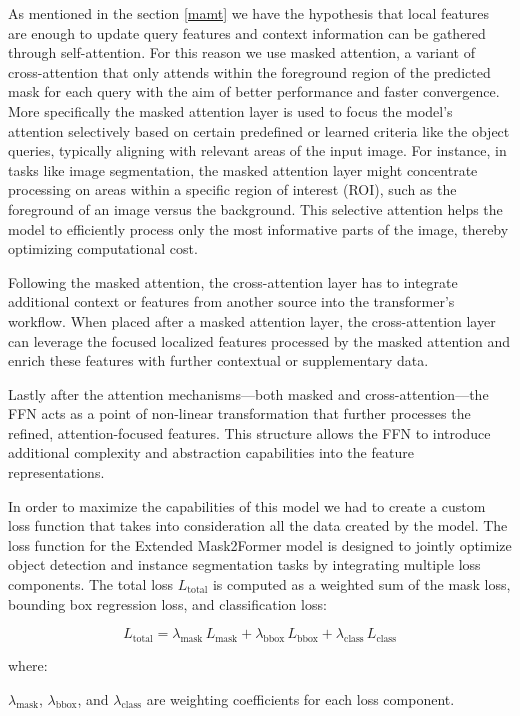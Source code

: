 \newpage
As mentioned in the section \ref{mamt} we have the hypothesis that local features are enough to update query features and context information can be 
gathered through self-attention. For this reason we use masked attention, a variant of cross-attention that only attends within the foreground region of 
the predicted mask for each query with the aim of better performance and faster convergence. More specifically the masked attention layer is used to focus 
the model’s attention selectively based on certain predefined or learned criteria like the object queries, typically aligning with relevant areas of the 
input image. For instance, in tasks like image segmentation, the masked attention layer might concentrate processing on areas within a specific region of 
interest (ROI), such as the foreground of an image versus the background. This selective attention helps the model to efficiently process only the most 
informative parts of the image, thereby optimizing computational cost.


Following the masked attention, the cross-attention layer has to integrate additional context or features from another source into the transformer’s workflow. 
When placed after a masked attention layer, the cross-attention layer can leverage the focused localized features processed by the masked attention and enrich 
these features with further contextual or supplementary data. 

Lastly after the attention mechanisms—both masked and cross-attention—the FFN acts as a point of non-linear transformation that further processes the refined, 
attention-focused features. This structure allows the FFN to introduce additional complexity and abstraction capabilities into the feature representations.


In order to maximize the capabilities of this model we had to create a custom loss function that takes into consideration all the data created by the model. 
The loss function for the Extended Mask2Former model is designed to jointly optimize object detection and instance segmentation tasks by integrating multiple 
loss components. The total loss \( L_{\text{total}} \) is computed as a weighted sum of the mask loss, bounding box regression loss, and classification loss:

\[
L_{\text{total}} = \lambda_{\text{mask}} \, L_{\text{mask}} + \lambda_{\text{bbox}} \, L_{\text{bbox}} + \lambda_{\text{class}} \, L_{\text{class}}
\]

where:

\( \lambda_{\text{mask}} \), \( \lambda_{\text{bbox}} \), and \( \lambda_{\text{class}} \) are weighting coefficients for each loss component.


